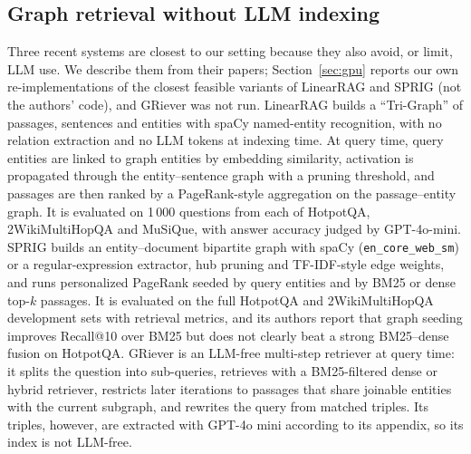 \documentclass[a4paper,fleqn]{cas-sc}
\begin{document}
\subsection{Graph retrieval without LLM indexing}\label{sec:lightgraph}
Three recent systems are closest to our setting because they also avoid, or limit, LLM use. We describe them from their papers; Section~\ref{sec:gpu} reports our own re-implementations of the closest feasible variants of LinearRAG and SPRIG (not the authors' code), and GRiever was not run. LinearRAG \citep{zhuang2025linearrag} builds a ``Tri-Graph'' of passages, sentences and entities with spaCy named-entity recognition, with no relation extraction and no LLM tokens at indexing time. At query time, query entities are linked to graph entities by embedding similarity, activation is propagated through the entity--sentence graph with a pruning threshold, and passages are then ranked by a PageRank-style aggregation on the passage--entity graph. It is evaluated on 1\,000 questions from each of HotpotQA, 2WikiMultiHopQA and MuSiQue, with answer accuracy judged by GPT-4o-mini. SPRIG \citep{wang2026sprig} builds an entity--document bipartite graph with spaCy (\texttt{en\_core\_web\_sm}) or a regular-expression extractor, hub pruning and TF-IDF-style edge weights, and runs personalized PageRank seeded by query entities and by BM25 or dense top-$k$ passages. It is evaluated on the full HotpotQA and 2WikiMultiHopQA development sets with retrieval metrics, and its authors report that graph seeding improves Recall@10 over BM25 but does not clearly beat a strong BM25--dense fusion on HotpotQA. GRiever \citep{melo2025griever} is an LLM-free multi-step retriever at query time: it splits the question into sub-queries, retrieves with a BM25-filtered dense or hybrid retriever, restricts later iterations to passages that share joinable entities with the current subgraph, and rewrites the query from matched triples. Its triples, however, are extracted with GPT-4o mini according to its appendix, so its index is not LLM-free.
\end{document}
